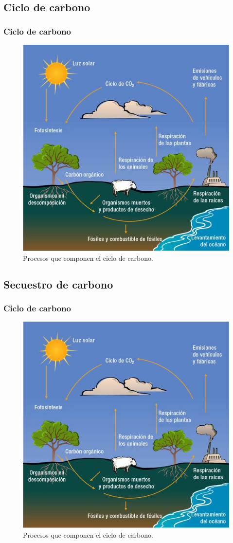 \documentclass[xcolor=table]{beamer}
\begin{document}
	\subsection{Ciclo de carbono}
	\begin{frame}
		\frametitle{Ciclo de carbono}		
		\begin{figure}
			\centering
			\includegraphics[width=0.5\linewidth]{imagenes/cicloCarbono}
			\caption{Procesos que componen el ciclo de carbono.}
			\label{fig:cicloCarbono}
		\end{figure}
	\end{frame}

	\subsection{Secuestro de carbono}
	\begin{frame}
		\frametitle{Ciclo de carbono}		
		\begin{figure}
			\centering
			\includegraphics[width=0.5\linewidth]{imagenes/cicloCarbono}
			\caption{Procesos que componen el ciclo de carbono.}
			\label{fig:cicloCarbono}
		\end{figure}
	\end{frame}
	
\end{document}

